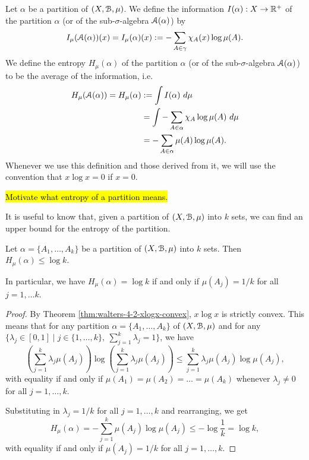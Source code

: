 \begin{definition}
	Let $\alpha$ be a partition of $(X, \mathcal{B}, \mu)$. We define the information $I(\alpha) : X \to \mathbb{R}^+$ of the partition $\alpha$ (or of the sub-$\sigma$-algebra $\mathcal{A}(\alpha)$) by
	\[
		I_\mu(\mathcal{A}(\alpha))(x) = I_\mu(\alpha)(x) := -\sum_{A \in \gamma}{\chi_A(x) \log{\mu(A)}}.
	\]
	We define the entropy $H_\mu(\alpha)$ of the partition $\alpha$ (or of the sub-$\sigma$-algebra $\mathcal{A}(\alpha)$) to be the average of the information, i.e.
	\begin{align*}
		H_\mu(\mathcal{A}(\alpha)) = H_\mu(\alpha) &:= \int{I(\alpha)\ d\mu} \\
			&= \int{-\sum_{A \in \alpha}{\chi_A \log{\mu(A)}}\ d\mu} \\
			&= -\sum_{A \in \alpha}{\mu(A) \log{\mu(A)}}.
	\end{align*}
	Whenever we use this definition and those derived from it, we will use the convention that $x \log x = 0$ if $x = 0$.
\end{definition}

\hl{Motivate what entropy of a partition means.}

It is useful to know that, given a partition of $(X, \mathcal{B}, \mu)$ into $k$ sets, we can find an upper bound for the entropy of the partition.

\begin{proposition} \label{prop:walters-cor-4-2-1}
	Let $\alpha = \{A_1, \dots, A_k\}$ be a partition of $(X, \mathcal{B}, \mu)$ into $k$ sets. Then $H_\mu(\alpha) \leq \log{k}$.
	
	In particular, we have $H_\mu(\alpha) = \log{k}$ if and only if $\mu(A_j) = 1 / k$ for all $j = 1, \dots k$.
	
	\begin{proof}
		By Theorem \ref{thm:walters-4-2-xlogx-convex}, $x \log{x}$ is strictly convex. This means that for any partition $\alpha = \{A_1, \dots, A_k\}$ of $(X, \mathcal{B}, \mu)$ and for any $\{\lambda_j \in [0, 1] \mid j \in \{1, \dots, k\},\ \sum_{j = 1}^k{\lambda_j} = 1\}$, we have
		\[
			\left(\sum_{j = 1}^k{\lambda_j \mu(A_j)}\right) \log{\left(\sum_{j = 1}^k{\lambda_j \mu(A_j)}\right)} \leq \sum_{j = 1}^k{\lambda_j \mu(A_j) \log{\mu(A_j)}},
		\]
		with equality if and only if $\mu(A_1) = \mu(A_2) = \dots = \mu(A_k)$ whenever $\lambda_j \neq 0$ for all $j = 1, \dots, k$.
		
		Substituting in $\lambda_j = 1 / k$ for all $j = 1, \dots, k$ and rearranging, we get
		\[
			H_\mu(\alpha) = -\sum_{j = 1}^k{\mu(A_j) \log{\mu(A_j)}} \leq -\log{\frac{1}{k}} = \log{k},
		\]
		with equality if and only if $\mu(A_j) = 1 / k$ for all $j = 1, \dots, k$.
	\end{proof}
\end{proposition}

